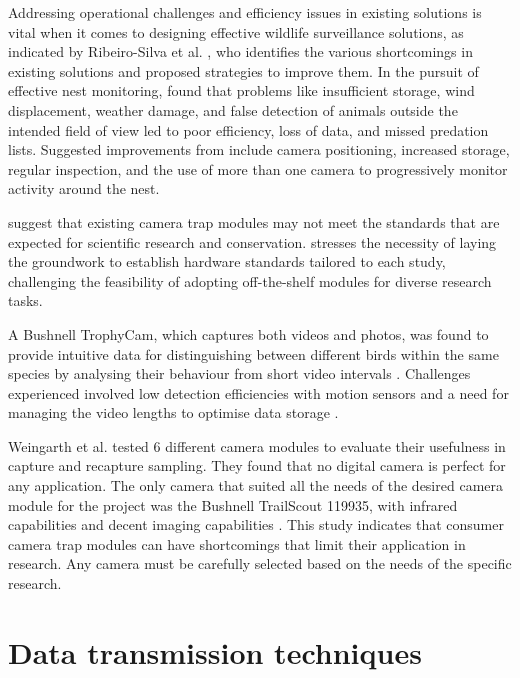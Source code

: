\documentclass[class=report,11pt,crop=false]{standalone}
\begin{document}
Addressing operational challenges and efficiency issues in existing solutions is vital when it comes to designing effective wildlife surveillance solutions, as indicated by Ribeiro-Silva  et al. \cite{ribeiro-silva2018testing}, who identifies the various shortcomings in existing solutions and proposed strategies to improve them. In the pursuit of effective nest monitoring, \cite{ribeiro-silva2018testing} found that problems like insufficient storage, wind displacement, weather damage, and false detection of animals outside the intended field of view led to poor efficiency, loss of data, and missed predation lists. Suggested improvements from \cite{ribeiro-silva2018testing} include camera positioning, increased storage, regular inspection, and the use of more than one camera to progressively monitor activity around the nest. 

\cite{ahumada2020wildlife} suggest that existing camera trap modules may not meet the standards that are expected for scientific research and conservation. \cite{ahumada2020wildlife} stresses the necessity of laying the groundwork to establish hardware standards tailored to each study, challenging the feasibility of adopting off-the-shelf modules for diverse research tasks. 

A Bushnell TrophyCam, which captures both videos and photos, was found to provide intuitive data for distinguishing between different birds within the same species by analysing their behaviour from short video intervals \cite{glover2019camera}. Challenges experienced involved low detection efficiencies with motion sensors and a need for managing the video lengths to optimise data storage \cite{ribeiro-silva2018testing}. 

Weingarth et al. \cite{weingarth2013evaluation} tested 6 different camera modules to evaluate their usefulness in capture and recapture sampling. They found that no digital camera is perfect for any application. The only camera that suited all the needs of the desired camera module for the project was the Bushnell TrailScout 119935, with infrared capabilities and decent imaging capabilities \cite{weingarth2013evaluation}. This study indicates that consumer camera trap modules can have shortcomings that limit their application in research. Any camera must be carefully selected based on the needs of the specific research.

\section{Data transmission techniques}
\end{document}
